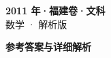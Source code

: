 \documentclass[zihao=-4, a4paper]{ctexart}
\begin{document}
\begin{center}
  {\Large\bfseries 2011 年·福建卷·文科}\\[4pt]
  {\large 数学 · 解析版}
\end{center}
\medskip
{}

\clearpage
{}
\begin{center}{\Large\bfseries 参考答案与详细解析}\end{center}
\medskip

\end{document}
